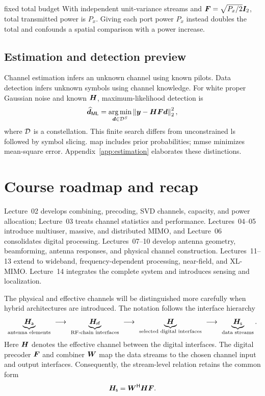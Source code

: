\begin{example}{fixed total budget}
With independent unit-variance streams and $\bm{F}=\sqrt{P_{x}/2}\bm{I}_2$, total transmitted power is $P_{x}$. Giving each port power $P_{x}$ instead doubles the total and confounds a spatial comparison with a power increase.
\end{example}

\subsection{Estimation and detection preview}
Channel estimation infers an unknown channel using known pilots. Data detection infers unknown symbols using channel knowledge. For white proper Gaussian noise and known $\bm{H}$, maximum-likelihood detection is
\begin{equation}\label{eq:ml}
\widehat{\bm{d}}_{\mathsf{ML}}=\operatorname*{arg\,min}_{\bm{d}\in\mathcal{D}^{S}}
\left\|\bm{y}-\bm{H}\bm{F}\bm{d}\right\|_2^2,
\end{equation}
where $\mathcal{D}$ is a constellation. This finite search differs from unconstrained \ac{ls} followed by symbol slicing. \Ac{map} includes prior probabilities; \ac{mmse} minimizes mean-square error. Appendix~\ref{app:estimation} elaborates these distinctions.

\section{Course roadmap and recap}
Lecture~02 develops combining, precoding, SVD channels, capacity, and power allocation; Lecture~03 treats channel statistics and performance. Lectures~04--05 introduce multiuser, massive, and distributed MIMO, and Lecture~06 consolidates digital processing. Lectures~07--10 develop antenna geometry, beamforming, antenna responses, and physical channel construction. Lectures~11--13 extend to wideband, frequency-dependent processing, near-field, and XL-MIMO. Lecture~14 integrates the complete system and introduces sensing and localization.

The physical and effective channels will be distinguished more carefully when hybrid architectures are introduced. The notation follows the interface hierarchy
\begin{equation}
\underbrace{\Ha}_{\text{antenna elements}}
\ \longrightarrow\ 
\underbrace{\Hrf}_{\text{RF-chain interfaces}}
\ \longrightarrow\ 
\underbrace{\ma{H}}_{\text{selected digital interfaces}}
\ \longrightarrow\ 
\underbrace{\Hs}_{\text{data streams}}.
\end{equation}
Here $\bm{H}$ denotes the effective channel between the digital interfaces. The digital precoder $\bm{F}$ and combiner $\bm{W}$ map the data streams to the chosen channel input and output interfaces. Consequently, the stream-level relation retains the common form
\begin{equation}
\bm{H}_{\mathsf{s}}={\bm{W}}^{\mathsf{H}}\bm{H}\bm{F}.
\end{equation}
